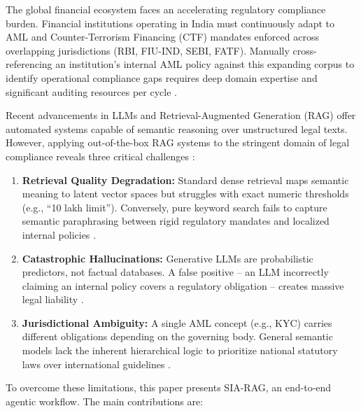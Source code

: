 \documentclass[conference, a4paper]{IEEEtran}
\begin{document}
The global financial ecosystem faces an accelerating regulatory compliance burden. Financial
institutions operating in India must continuously adapt to AML and Counter-Terrorism Financing
(CTF) mandates enforced across overlapping jurisdictions (RBI, FIU-IND, SEBI, FATF). Manually
cross-referencing an institution's internal AML policy against this expanding corpus to identify
operational compliance gaps requires deep domain expertise and significant auditing resources per
cycle \cite{c1}.

Recent advancements in LLMs and Retrieval-Augmented Generation (RAG) offer automated systems
capable of semantic reasoning over unstructured legal texts. However, applying out-of-the-box RAG
systems to the stringent domain of legal compliance reveals three critical challenges \cite{c6}:

\begin{enumerate}
    \item \textbf{Retrieval Quality Degradation:} Standard dense retrieval maps semantic meaning
    to latent vector spaces but struggles with exact numeric thresholds (e.g., ``\rupee{}10 lakh
    limit''). Conversely, pure keyword search fails to capture semantic paraphrasing between rigid
    regulatory mandates and localized internal policies \cite{c2, c3}.

    \item \textbf{Catastrophic Hallucinations:} Generative LLMs are probabilistic predictors, not
    factual databases. A false positive -- an LLM incorrectly claiming an internal policy covers a
    regulatory obligation -- creates massive legal liability \cite{c5, c11}.

    \item \textbf{Jurisdictional Ambiguity:} A single AML concept (e.g., KYC) carries different
    obligations depending on the governing body. General semantic models lack the inherent
    hierarchical logic to prioritize national statutory laws over international guidelines
    \cite{c10}.
\end{enumerate}

To overcome these limitations, this paper presents SIA-RAG, an end-to-end agentic workflow. The
main contributions are:
\end{document}
